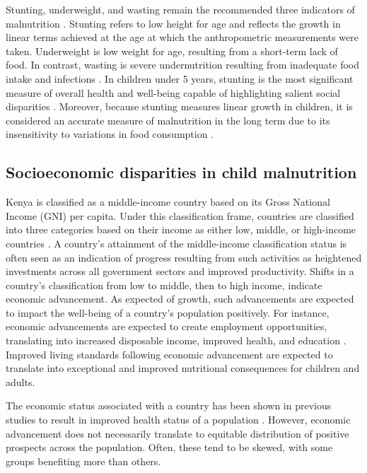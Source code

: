 \documentclass[sn-basic,Numbered,pdflatex]{sn-jnl}
\theoremstyle{remark}
\theoremstyle{definition}
\begin{document}
Stunting, underweight, and wasting remain the recommended three
indicators of malnutrition \citep{jonah2018}. Stunting refers to low
height for age and reflects the growth in linear terms achieved at the
age at which the anthropometric measurements were taken. Underweight is
low weight for age, resulting from a short-term lack of food. In
contrast, wasting is severe undernutrition resulting from inadequate
food intake and infections \citep{jonah2018}. In children under 5 years,
stunting is the most significant measure of overall health and
well-being capable of highlighting salient social disparities
\citep{deOnis2016}. Moreover, because stunting measures linear growth in
children, it is considered an accurate measure of malnutrition in the
long term due to its insensitivity to variations in food consumption
\citep{Hoddinott2013, Zere2003}.

\hypertarget{socioeconomic-disparities-in-child-malnutrition}{%
\subsection{Socioeconomic disparities in child
malnutrition}\label{socioeconomic-disparities-in-child-malnutrition}}

Kenya is classified as a middle-income country based on its Gross
National Income (GNI) per capita. Under this classification frame,
countries are classified into three categories based on their income as
either low, middle, or high-income countries \citep{jonah2018}. A
country's attainment of the middle-income classification status is often
seen as an indication of progress resulting from such activities as
heightened investments across all government sectors and improved
productivity. Shifts in a country's classification from low to middle,
then to high income, indicate economic advancement. As expected of
growth, such advancements are expected to impact the well-being of a
country's population positively. For instance, economic advancements are
expected to create employment opportunities, translating into increased
disposable income, improved health, and education
\citep{Bloom2004, Ranis2000}. Improved living standards following
economic advancement are expected to translate into exceptional and
improved nutritional consequences for children and adults.

The economic status associated with a country has been shown in previous
studies to result in improved health status of a population
\citep{Marmot2002, Ettner1996}. However, economic advancement does not
necessarily translate to equitable distribution of positive prospects
across the population. Often, these tend to be skewed, with some groups
benefiting more than others.
\end{document}
